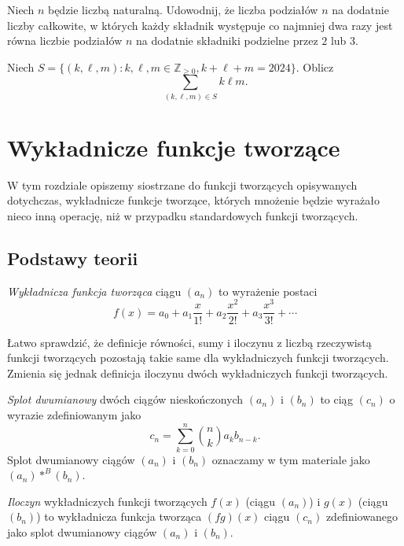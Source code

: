 \documentclass[shortabstract]{imthesis}
\begin{document}
\begin{problem} \label{problem:partitions23}
Niech $n$ będzie liczbą naturalną. Udowodnij, że liczba podziałów $n$ na dodatnie liczby całkowite, w których każdy składnik występuje co najmniej dwa razy jest równa liczbie podziałów $n$ na dodatnie składniki podzielne przez $2$ lub $3$.
\end{problem}
\begin{problem} \label{problem:klm}
Niech $S= \{(k, \ell, m): k, \ell, m \in \mathbb{Z}_{\geq 0}, k+\ell+m=2024\}$. Oblicz
$$
    \sum_{(k, \ell, m) \in S} k\ell m.
$$
\end{problem}

\chapter{Wykładnicze funkcje tworzące}

W tym rozdziale opiszemy siostrzane do funkcji tworzących opisywanych dotychczas, wykładnicze funkcje tworzące, których mnożenie będzie wyrażało nieco inną operację, niż w przypadku standardowych funkcji tworzących.

\section{Podstawy teorii}

\begin{definition}
    \emph{Wykładnicza funkcja tworząca} ciągu $(a_n)$ to wyrażenie postaci
    $$
    f(x) = a_0 + a_1\frac{x}{1!} + a_2\frac{x^2}{2!} + a_3\frac{x^3}{3!} + \cdots
    $$
\end{definition}

Łatwo sprawdzić, że definicje równości, sumy i iloczynu z liczbą rzeczywistą funkcji tworzących pozostają takie same dla wykładniczych funkcji tworzących. Zmienia się jednak definicja iloczynu dwóch wykładniczych funkcji tworzących.

\begin{definition} \label{def:binomialconv}
    \emph{Splot dwumianowy} dwóch ciągów nieskończonych $(a_n)$ i $(b_n)$ to ciąg $(c_n)$ o wyrazie zdefiniowanym jako
    $$
    c_n = \sum_{k=0}^n {n \choose k} a_k b_{n-k}.
    $$
    Splot dwumianowy ciągów $(a_n)$ i $(b_n)$ oznaczamy w tym materiale jako $(a_n) *^B (b_n)$.
\end{definition}

\begin{definition}
    \emph{Iloczyn} wykładniczych funkcji tworzących $f(x)$ (ciągu $(a_n)$) i $g(x)$ (ciągu $(b_n)$) to wykładnicza funkcja tworząca $(fg)(x)$ ciągu $(c_n)$ zdefiniowanego jako splot dwumianowy ciągów $(a_n)$ i $(b_n)$.
\end{definition}
\end{document}
